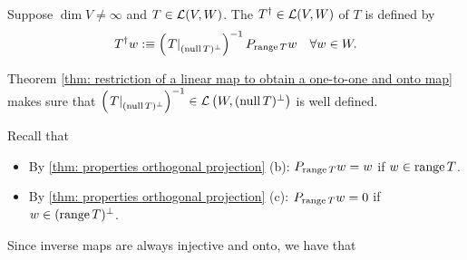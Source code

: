 \begin{mydef}
  Suppose $\dim V \neq \infty$ and $T \in \mathcal{L}(V,W)$. The  $T^\dagger \in \mathcal{L}(V, W)$ of $T$ is defined by
  \[
    T^\dagger w :\equiv  \left( \left. T \right|_{(\operatorname{null} T)^\bot} \right)^{-1} P_{\operatorname{range} T} w \quad \forall w \in W.
  \]

  Theorem \ref{thm: restriction of a linear map to obtain a one-to-one and onto map} makes sure that $\left( \left. T \right|_{(\operatorname{null} T)^\bot} \right)^{-1} \in \mathcal{L} \left(W, (\operatorname{null} T)^\bot \right)$ is well defined.
\end{mydef}

Recall that
\begin{itemize}
  \item By \ref{thm: properties orthogonal projection} (b): $P_{\operatorname{range} T} w = w$ if $w \in \operatorname{range} T$.
  \item By \ref{thm: properties orthogonal projection} (c): $P_{\operatorname{range} T} w =0$ if $w \in (\operatorname{range} T)^\bot$.
\end{itemize}

Since inverse maps are always injective and onto, we have that

